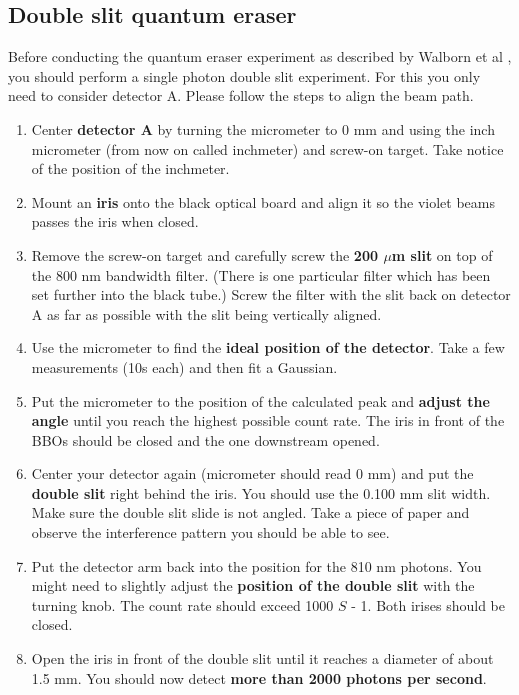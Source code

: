 \documentclass{../lab}
\begin{document}
\subsection{Double slit quantum eraser}

Before conducting the quantum eraser experiment as described by Walborn et al \cite{Walborn}, you should perform a single photon double slit experiment. For this you only need to consider detector A. Please follow the steps to align the beam path.

\begin{enumerate}
    \item Center \textbf{detector A} by turning the micrometer to 0 mm and using the inch micrometer (from now on called inchmeter) and screw-on target. Take notice of the position of the inchmeter.

    \item Mount an \textbf{iris} onto the black optical board and align it so the violet beams passes the iris when closed.

    \item Remove the screw-on target and carefully screw the \textbf{200 $\mu$m slit} on top of the 800 nm bandwidth filter. (There is one particular filter which has been set further into the black tube.) Screw the filter with the slit back on detector A as far as possible with the slit being vertically aligned.

    \item Use the micrometer to find the \textbf{ideal position of the detector}. Take a few measurements (10s each) and then fit a Gaussian.

    \item Put the micrometer to the position of the calculated peak and \textbf{adjust the angle} until you reach the highest possible count rate. The iris in front of the BBOs should be closed and the one downstream opened.

    \item Center your detector again (micrometer should read 0 mm) and put the \textbf{double slit} right behind the iris. You should use the 0.100 mm slit width. Make sure the double slit slide is not angled. Take a piece of paper and observe the interference pattern you should be able to see.

    \item Put the detector arm back into the position for the 810 nm photons. You might need to slightly adjust the \textbf{position of the double slit} with the turning knob. The count rate should exceed 1000 $S$ - 1. Both irises should be closed.

    \item Open the iris in front of the double slit until it reaches a diameter of about 1.5 mm. You should now detect \textbf{more than 2000 photons per second}.

\end{enumerate}
\end{document}

